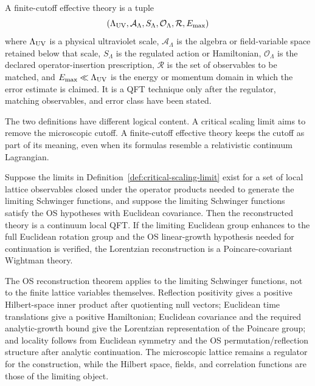\begin{definition}
\label{def:finite-cutoff-effective-theory}
A finite-cutoff effective theory is a tuple
\[
  (\Lambda_{\rm UV},\mathcal A_\Lambda,S_\Lambda,\mathcal O_\Lambda,
   \mathcal R,E_{\rm max})
\]
where \(\Lambda_{\rm UV}\) is a physical ultraviolet scale,
\(\mathcal A_\Lambda\) is the algebra or field-variable space retained below
that scale, \(S_\Lambda\) is the regulated action or Hamiltonian,
\(\mathcal O_\Lambda\) is the declared operator-insertion prescription,
\(\mathcal R\) is the set of observables to be matched, and
\(E_{\rm max}\ll\Lambda_{\rm UV}\) is the energy or momentum domain in which
the error estimate is claimed.  It is a QFT technique only after the
regulator, matching observables, and error class have been stated.
\end{definition}

The two definitions have different logical content.  A critical scaling limit
aims to remove the microscopic cutoff.  A finite-cutoff effective theory keeps
the cutoff as part of its meaning, even when its formulas resemble a
relativistic continuum Lagrangian.

\begin{remark}
\label{rem:scaling-limit-continuum-qft}
Suppose the limits in Definition~\ref{def:critical-scaling-limit} exist for a
set of local lattice observables closed under the operator products needed to
generate the limiting Schwinger functions, and suppose the limiting
Schwinger functions satisfy the OS hypotheses with Euclidean covariance.
Then the reconstructed theory is a continuum local QFT.  If the limiting
Euclidean group enhances to the full Euclidean rotation group and the OS
linear-growth hypothesis needed for continuation is verified, the Lorentzian
reconstruction is a Poincare-covariant Wightman theory.

The OS reconstruction theorem applies to the limiting Schwinger functions,
not to the finite lattice variables themselves.  Reflection positivity gives a
positive Hilbert-space inner product after quotienting null vectors;
Euclidean time translations give a positive Hamiltonian; Euclidean covariance
and the required analytic-growth bound give the Lorentzian representation of
the Poincare group; and locality follows from Euclidean symmetry and the OS
permutation/reflection structure after analytic continuation.  The
microscopic lattice remains a regulator for the construction, while the
Hilbert space, fields, and correlation functions are those of the limiting
object.
\end{remark}

